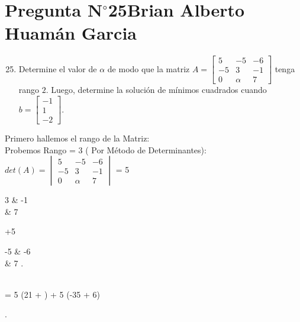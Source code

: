 \section{Pregunta N$^{\circ}$25\qquad Brian Alberto Huamán Garcia}

\begin{frame}
	\begin{enumerate}\setcounter{enumi}{24}
		\item

		      Determine el valor de $\alpha$ de modo que la matriz
		      \begin{math}
			      A=
			      \begin{bmatrix}
				      5  & -5     & -6 \\
				      -5 & 3      & -1 \\
				      0  & \alpha & 7
			      \end{bmatrix}
		      \end{math}
		      tenga rango $2$.
		      Luego, determine la solución de mínimos cuadrados cuando
		      \begin{math}
			      b=
			      \begin{bmatrix}
				      -1 \\
				      1  \\
				      -2
			      \end{bmatrix}
		      \end{math}.
	\end{enumerate}

	\begin{solution}
     Primero hallemos el rango de la Matriz:\\
     Probemos Rango = 3  ( Por Método de Determinantes): \\
        \begin{math}
			det(A)=
			\begin{vmatrix}
			5  & -5     & -6 \\
			-5 & 3      & -1 \\
			0  & \alpha & 7
			\end{vmatrix}
		\end{math} = 
            5 
            \begin{vmatrix}
		  3      & -1 \\
			\alpha & 7
			\end{vmatrix} +5
            \begin{vmatrix}
		  -5     & -6 \\
			\alpha & 7
		.   \end{vmatrix} \\
        \hspace{5cm} = 5 (21 + \alpha) + 5 (-35 + 6\alpha)
	\end{solution}
\end{frame}

\begin{frame}
	\begin{solution}

		.
	\end{solution}
\end{frame}